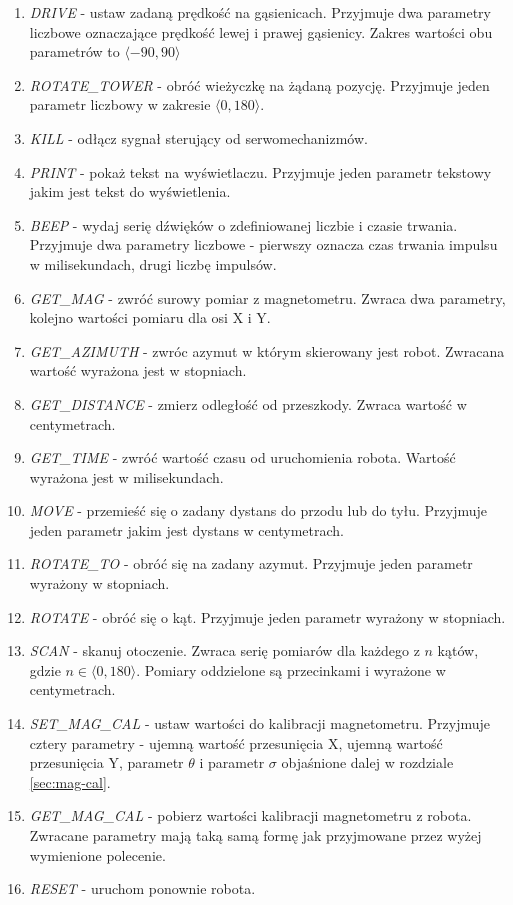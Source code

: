 \begin{enumerate}
    \item \emph{DRIVE} - ustaw zadaną prędkość na gąsienicach. Przyjmuje dwa parametry liczbowe oznaczające prędkość lewej i prawej gąsienicy. Zakres wartości obu parametrów to $\langle-90,90\rangle$
    \item \emph{ROTATE\_TOWER} - obróć wieżyczkę na żądaną pozycję. Przyjmuje jeden parametr liczbowy w zakresie $\langle0,180\rangle$.
    \item \emph{KILL} - odłącz sygnał sterujący od serwomechanizmów.
    \item \emph{PRINT} - pokaż tekst na wyświetlaczu. Przyjmuje jeden parametr tekstowy jakim jest tekst do wyświetlenia.
    \item \emph{BEEP} - wydaj serię dźwięków o zdefiniowanej liczbie i czasie trwania. Przyjmuje dwa parametry liczbowe - pierwszy oznacza czas trwania impulsu w milisekundach, drugi liczbę impulsów.
    \item \emph{GET\_MAG} - zwróć surowy pomiar z magnetometru. Zwraca dwa parametry, kolejno wartości pomiaru dla osi X i Y.
    \item \emph{GET\_AZIMUTH} - zwróc azymut w którym skierowany jest robot. Zwracana wartość wyrażona jest w stopniach.
    \item \emph{GET\_DISTANCE} - zmierz odległość od przeszkody. Zwraca wartość w centymetrach.
    \item \emph{GET\_TIME} - zwróć wartość czasu od uruchomienia robota. Wartość wyrażona jest w milisekundach.
    \item \emph{MOVE} - przemieść się o zadany dystans do przodu lub do tyłu. Przyjmuje jeden parametr jakim jest dystans w centymetrach.
    \item \emph{ROTATE\_TO} - obróć się na zadany azymut. Przyjmuje jeden parametr wyrażony w stopniach.
    \item \emph{ROTATE} - obróć się o kąt. Przyjmuje jeden parametr wyrażony w stopniach.
    \item \emph{SCAN} - skanuj otoczenie. Zwraca serię pomiarów dla każdego z $n$ kątów, gdzie $n\in{\langle0,180\rangle}$. Pomiary oddzielone są przecinkami i wyrażone w centymetrach.
    \item \emph{SET\_MAG\_CAL} - ustaw wartości do kalibracji magnetometru. Przyjmuje cztery parametry - ujemną wartość przesunięcia X, ujemną wartość przesunięcia Y, parametr $\theta$ i parametr $\sigma$ objaśnione dalej w rozdziale \ref{sec:mag-cal}. 
    \item \emph{GET\_MAG\_CAL} - pobierz wartości kalibracji magnetometru z robota. Zwracane parametry mają taką samą formę jak przyjmowane przez wyżej wymienione polecenie.
    \item \emph{RESET} - uruchom ponownie robota.
\end{enumerate}

